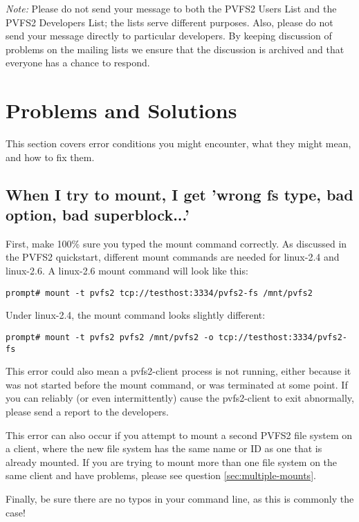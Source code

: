 \documentclass[11pt,letterpaper]{article}
\begin{document}
\emph{Note:} Please do not send your message to both the PVFS2 Users List and
the PVFS2 Developers List; the lists serve different purposes.  Also, please
do not send your message directly to particular developers.  By keeping
discussion of problems on the mailing lists we ensure that the discussion is
archived and that everyone has a chance to respond.

%
%

\section{Problems and Solutions}
This section covers error conditions you might encounter, what they might mean,
and how to fix them.

\subsection{When I try to mount, I get 'wrong fs type, bad option, bad
superblock...'}

First, make 100\% sure you typed the mount command correctly. As discussed in
the PVFS2 quickstart, different mount commands are needed for linux-2.4 and
linux-2.6.  A linux-2.6 mount command will look like this: 

\begin{verbatim}
prompt# mount -t pvfs2 tcp://testhost:3334/pvfs2-fs /mnt/pvfs2
\end{verbatim}

Under linux-2.4, the mount command looks slightly different:
\begin{verbatim}
prompt# mount -t pvfs2 pvfs2 /mnt/pvfs2 -o tcp://testhost:3334/pvfs2-fs
\end{verbatim}

This error could also mean a pvfs2-client process is not running,
either because it was not started before the mount command, or was
terminated at some point. If you can reliably (or even intermittently)
cause the pvfs2-client to exit abnormally, please send a report to the
developers.

This error can also occur if you attempt to mount a second PVFS2 file system
on a client, where the new file system has the same name or ID as one
that is already mounted.  If you are trying to mount more than one file system
on the same client and have problems, please see question
\ref{sec:multiple-mounts}.

Finally, be sure there are no typos in your command line, as this is
commonly the case!
\end{document}
